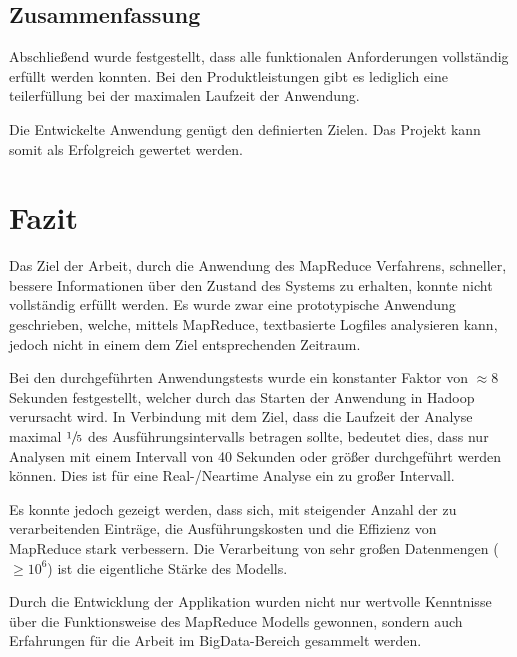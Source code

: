 \subsection{Zusammenfassung}
Abschließend wurde festgestellt, dass alle funktionalen Anforderungen vollständig erfüllt werden konnten. Bei den Produktleistungen gibt es lediglich eine teilerfüllung bei der maximalen Laufzeit der Anwendung.

Die Entwickelte Anwendung genügt den definierten Zielen. Das Projekt kann somit als Erfolgreich gewertet werden. 



\section{Fazit}\label{sec:Fazit}
Das Ziel der Arbeit, durch die Anwendung des MapReduce Verfahrens, schneller, bessere Informationen über den Zustand des Systems zu erhalten, konnte nicht vollständig erfüllt werden. Es wurde zwar eine prototypische Anwendung geschrieben, welche, mittels MapReduce, textbasierte Logfiles analysieren kann, jedoch nicht in einem dem Ziel entsprechenden Zeitraum.

Bei den durchgeführten Anwendungstests wurde ein konstanter Faktor von $\approx 8$ Sekunden festgestellt, welcher durch das Starten der Anwendung in Hadoop verursacht wird. In Verbindung mit dem Ziel, dass die Laufzeit der Analyse maximal $\sfrac{1}{5}$ des Ausführungsintervalls betragen sollte, bedeutet dies, dass nur Analysen mit einem Intervall von 40 Sekunden oder größer durchgeführt werden können. Dies ist für eine Real-/Neartime Analyse ein zu großer Intervall.

Es konnte jedoch gezeigt werden, dass sich, mit steigender Anzahl der zu verarbeitenden Einträge, die Ausführungskosten und die Effizienz von MapReduce stark verbessern. Die Verarbeitung von sehr großen Datenmengen ($\geq10^6$) ist die eigentliche Stärke des Modells.

Durch die Entwicklung der Applikation wurden nicht nur wertvolle Kenntnisse über die Funktionsweise des MapReduce Modells gewonnen, sondern auch Erfahrungen für die Arbeit im BigData-Bereich gesammelt werden.


